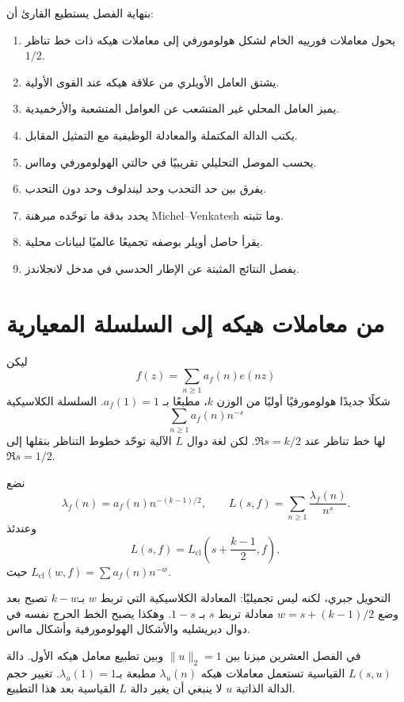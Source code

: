 بنهاية الفصل يستطيع القارئ أن:
\begin{enumerate}
  \item يحول معاملات فورييه الخام لشكل هولومورفي إلى معاملات هيكه
  ذات خط تناظر \(1/2\).
  \item يشتق العامل الأويلري من علاقة هيكه عند القوى الأولية.
  \item يميز العامل المحلي غير المتشعب عن العوامل المتشعبة
  والأرخميدية.
  \item يكتب الدالة المكتملة والمعادلة الوظيفية مع التمثيل المقابل.
  \item يحسب الموصل التحليلي تقريبيًا في حالتي الهولومورفي ومااس.
  \item يفرق بين حد التحدب وحد ليندلوف وحد دون التحدب.
  \item يحدد بدقة ما توحّده مبرهنة Michel--Venkatesh وما تثبته.
  \item يقرأ حاصل أويلر بوصفه تجميعًا عالميًا لبيانات محلية.
  \item يفصل النتائج المثبتة عن الإطار الحدسي في مدخل لانجلاندز.
\end{enumerate}

\section{من معاملات هيكه إلى السلسلة المعيارية}

ليكن
\[
f(z)=\sum_{n\ge1}a_f(n)e(nz)
\]
شكلًا جديدًا هولومورفيًا أوليًا من الوزن \(k\)، مطبعًا بـ
\(a_f(1)=1\). السلسلة الكلاسيكية
\[
\sum_{n\ge1}a_f(n)n^{-s}
\]
لها خط تناظر عند \(\Re s=k/2\). لكن لغة دوال \(L\) الآلية توحّد
خطوط التناظر بنقلها إلى \(\Re s=1/2\).

\begin{definition}
\label{def:ch21-hecke-normalization}
\provedhere
نضع
\[
\lambda_f(n)=a_f(n)n^{-(k-1)/2},
\qquad
L(s,f)=\sum_{n\ge1}\frac{\lambda_f(n)}{n^s}.
\]
وعندئذ
\[
L(s,f)=L_{\mathrm{cl}}\!\left(s+\frac{k-1}{2},f\right),
\]
حيث \(L_{\mathrm{cl}}(w,f)=\sum a_f(n)n^{-w}\).
\end{definition}

التحويل جبري، لكنه ليس تجميليًا: المعادلة الكلاسيكية التي تربط \(w\)
بـ\(k-w\) تصبح بعد وضع \(w=s+(k-1)/2\) معادلة تربط \(s\) بـ
\(1-s\). وهكذا يصبح الخط الحرج نفسه في دوال ديريشليه والأشكال
الهولومورفية وأشكال مااس.

\begin{remark}
في الفصل العشرين ميزنا بين \(\|u\|_2=1\) وبين تطبيع معامل هيكه الأول.
دالة \(L(s,u)\) القياسية تستعمل معاملات هيكه \(\lambda_u(n)\) مطبعة
بـ\(\lambda_u(1)=1\). تغيير حجم الدالة الذاتية \(u\) لا ينبغي أن
يغير دالة \(L\) القياسية بعد هذا التطبيع.
\end{remark}

